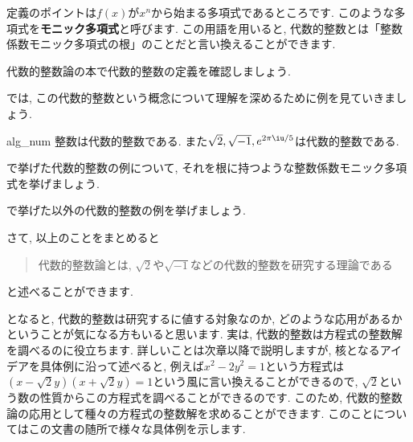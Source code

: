 \documentclass[11pt,b5paper,oneside,titlepage,lualatex]{ltjsreport}
\begin{document}
定義のポイントは$ f(x) $が$ x^n $から始まる多項式であるところです. 
このような多項式を\textbf{モニック多項式}と呼びます. 
この用語を用いると, 代数的整数とは「整数係数モニック多項式の根」のことだと言い換えることができます. 

\begin{exercise}{}{}
	代数的整数論の本で代数的整数の定義を確認しましょう. 
\end{exercise}

では, この代数的整数という概念について理解を深めるために例を見ていきましょう. 

\begin{example}{}{alg_num}
	整数は代数的整数である. また$ \sqrt{2}, \sqrt{-1}, e^{2\pi \iu/5} $は代数的整数である. 
\end{example}

\begin{exercise}{}{}
	で挙げた代数的整数の例について, それを根に持つような整数係数モニック多項式を挙げましょう. 
\end{exercise}

\begin{exercise}{}{}
	で挙げた以外の代数的整数の例を挙げましょう. 
\end{exercise}

さて, 以上のことをまとめると
\begin{quote}
	\centering
	代数的整数論とは, $ \sqrt{2} $や$ \sqrt{-1} $などの代数的整数を研究する理論である
\end{quote}
と述べることができます. 

となると, 代数的整数は研究するに値する対象なのか, どのような応用があるかということが気になる方もいると思います. 
実は, 代数的整数は方程式の整数解を調べるのに役立ちます. 
詳しいことは次章以降で説明しますが, 核となるアイデアを具体例に沿って述べると, 例えば$ x^2 - 2y^2 = 1 $という方程式は
$  \left(x - \sqrt{2}y \right) \left(x + \sqrt{2}y \right) = 1 $という風に言い換えることができるので, $ \sqrt{2} $という数の性質からこの方程式を調べることができるのです. 
このため, 代数的整数論の応用として種々の方程式の整数解を求めることができます. 
このことについてはこの文書の随所で様々な具体例を示します. 


\end{document}
